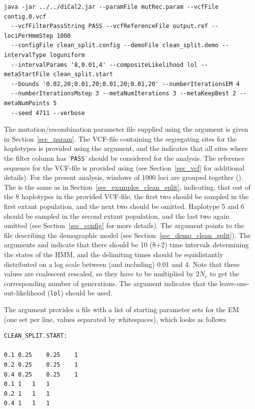 \documentclass{article}
\numberwithin{equation}{section}
\begin{document}
\begin{verbatim}
java -jar ../../diCal2.jar --paramFile mutRec.param --vcfFile contig.0.vcf
  --vcfFilterPassString PASS --vcfReferenceFile output.ref --lociPerHmmStep 1000
  --configFile clean_split.config --demoFile clean_split.demo --intervalType loguniform
  --intervalParams '8,0.01,4' --compositeLikelihood lol --metaStartFile clean_split.start
  --bounds '0.02,20;0.01,20;0.01,20;0.01,20' --numberIterationsEM 4
  --numberIterationsMstep 3 --metaNumIterations 3 --metaKeepBest 2 --metaNumPoints 5
  --seed 4711 --verbose
\end{verbatim}

The mutation/recombination parameter file supplied using the  argument is given in Section~\ref{sec_param}. The VCF-file containing the segregating sites for the haplotypes is provided using the  argument, and the  indicates that all sites where the filter column has '\texttt{PASS}' should be considered for the analysis. The reference sequence for the VCF-file is provided using  (see Section~\ref{sec_vcf} for additional details). For the present analysis, windows of 1000 loci are grouped together (). The  is the same as in Section~\ref{sec_examples_clean_split}, indicating, that out of the 8 haplotypes in the provided VCF-file, the first two should be sampled in the first extant population, and the next two should be omitted. Haplotype 5 and 6 should be sampled in the second extant population, and the last two again omitted (see Section~\ref{sec_config} for more details). The argument  points to the file describing the demographic model (see Section~\ref{sec_demo_clean_split}). The arguments  and  indicate that there should be 10 (8+2) time intervals determining the states of the HMM, and the delimiting times should be equidistantly distributed on a log scale between (and including) 0.01 and 4. Note that these values are coalescent rescaled, so they have to be multiplied by $2N_r$ to get the corresponding number of generations. The argument  indicates that the leave-one-out-likelihood (\texttt{lol}) should be used.

The argument  provides a file with a list of starting parameter sets for the EM (one set per line, values separated by whitespaces), which looks as follows

\begin{verbatim}
CLEAN_SPLIT.START:

0.1	0.25	0.25	1
0.2	0.25	0.25	1
0.4	0.25	0.25	1
0.1	1	1	1
0.2	1	1	1
0.4	1	1	1
\end{verbatim}
\end{document}
